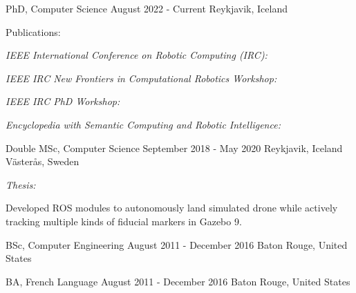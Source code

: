 

\begin{cventries}

  \cventry
    {PhD, Computer Science}
    {August 2022 - Current}
    {\hir}
    {Reykjavik, Iceland}
    {
    \vspace{-3mm}
    \begin{flushleft}
    Publications:
    \end{flushleft}
      \vspace{2mm}
      \begin{cvitems}
      \item {\emph{IEEE International Conference on Robotic Computing (IRC):} }
        \item {\emph{IEEE IRC New Frontiers in Computational Robotics Workshop:} }
        \item {\emph{IEEE IRC PhD Workshop:} }
	\item {\emph{Encyclopedia with Semantic Computing and Robotic Intelligence: }}
      \end{cvitems}
    }


  \doubleheadercventry
    {Double MSc, Computer Science} %
    {September 2018 - May 2020} %
    {\hir} %
    {Reykjavik, Iceland} %
    {\mdh}
    {Västerås, Sweden}
    {
      \begin{cvitems} %
        \item {\emph{Thesis:} } 
	\item Developed ROS modules to autonomously land simulated drone while actively tracking multiple kinds of fiducial markers in Gazebo 9.
      \end{cvitems}
    }
    
  \cventrywithoutdescription
    {BSc, Computer Engineering}
    {August 2011 - December 2016}
    {\lsu}
    {Baton Rouge, United States}

  \cventrywithoutdescription
    {BA, French Language}
    {August 2011 - December 2016}
    {\lsu}
    {Baton Rouge, United States}
\end{cventries}

